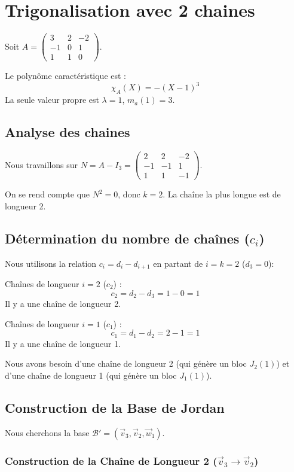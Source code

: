 \documentclass[french]{yLectureNote}
\renewcommand{\vec}{\overrightarrow}
\renewcommand{\vec}{\overrightarrow}
\begin{document}
\section{Trigonalisation avec 2 chaines}
Soit $A = \begin{pmatrix} 3 & 2 & -2 \\ -1 & 0 & 1 \\ 1 & 1 & 0 \end{pmatrix}$.

Le polynôme caractéristique est :
$$\chi_A(X) = -(X-1)^3$$
La seule valeur propre est $\lambda = 1$, $m_a(1) = 3$.
\subsection{Analyse des chaines}

Nous travaillons sur $N = A - I_3 = \begin{pmatrix} 2 & 2 & -2 \\ -1 & -1 & 1 \\ 1 & 1 & -1 \end{pmatrix}$.

On se rend compte que \(N^2 = 0\), donc $k=2$. La chaîne la plus longue est de longueur 2.

\subsection{Détermination du nombre de chaînes ($c_i$)}

Nous utilisons la relation $c_i = d_i - d_{i+1}$ en partant de $i=k=2$ ($d_3 = 0$):

Chaînes de longueur $i=2$ ($c_2$) :
    $$c_2 = d_2 - d_3 = 1 - 0 = 1$$
    Il y a une chaîne de longueur 2.

Chaînes de longueur $i=1$ ($c_1$) :
    $$c_1 = d_1 - d_2 = 2 - 1 = 1$$
    Il y a une chaîne de longueur 1.

Nous avons besoin d'une chaîne de longueur 2 (qui génère un bloc $J_2(1)$) et d'une chaîne de longueur 1 (qui génère un bloc $J_1(1)$).
\subsection{Construction de la Base de Jordan}

Nous cherchons la base $\mathcal{B}' = (\vec{v}_3, \vec{v}_2, \vec{w}_1)$.
\subsubsection{Construction de la Chaîne de Longueur 2 ($\vec{v}_3 \to \vec{v}_2$)}
\end{document}
